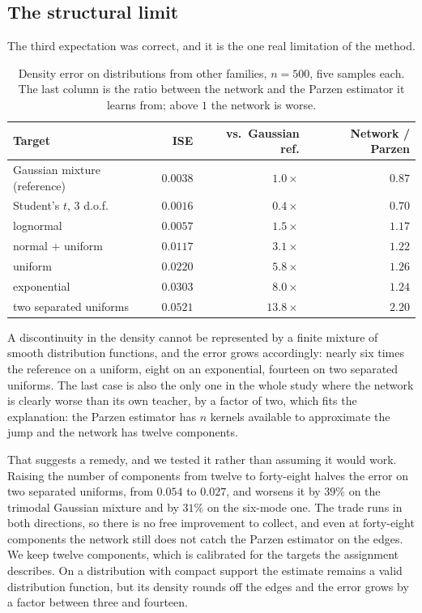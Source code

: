 \documentclass[11pt]{article}
\begin{document}
\subsection{The structural limit}

The third expectation was correct, and it is the one real limitation of the method.

\begin{table}[H]
\centering
\begin{tabular}{@{}lrrr@{}}
\toprule
\textbf{Target} & \textbf{ISE} & \textbf{vs.\ Gaussian ref.} & \textbf{Network / Parzen} \\
\midrule
Gaussian mixture (reference) & $0.0038$ & $1.0\times$ & $0.87$ \\
Student's $t$, 3 d.o.f.\ & $0.0016$ & $0.4\times$ & $0.70$ \\
lognormal & $0.0057$ & $1.5\times$ & $1.17$ \\
normal $+$ uniform & $0.0117$ & $3.1\times$ & $1.22$ \\
uniform & $0.0220$ & $5.8\times$ & $1.26$ \\
exponential & $0.0303$ & $8.0\times$ & $1.24$ \\
two separated uniforms & $0.0521$ & $13.8\times$ & $2.20$ \\
\bottomrule
\end{tabular}
\caption{Density error on distributions from other families, $n = 500$, five samples each.
The last column is the ratio between the network and the Parzen estimator it learns from;
above $1$ the network is worse.}
\label{tab:resilience}
\end{table}

A discontinuity in the density cannot be represented by a finite mixture of smooth
distribution functions, and the error grows accordingly: nearly six times the reference on a
uniform, eight on an exponential, fourteen on two separated uniforms. The last case is also
the only one in the whole study where the network is clearly worse than its own teacher, by a
factor of two, which fits the explanation: the Parzen estimator has $n$ kernels available to
approximate the jump and the network has twelve components.

That suggests a remedy, and we tested it rather than assuming it would work. Raising the
number of components from twelve to forty-eight halves the error on two separated uniforms,
from $0.054$ to $0.027$, and worsens it by $39\%$ on the trimodal Gaussian mixture and by
$31\%$ on the six-mode one. The trade runs in both directions, so there is no free
improvement to collect, and even at forty-eight components the network still does not catch
the Parzen estimator on the edges. We keep twelve components, which is calibrated for the
targets the assignment describes. On a distribution with compact support the estimate remains
a valid distribution function, but its density rounds off the edges and the error grows by a
factor between three and fourteen.
\end{document}
